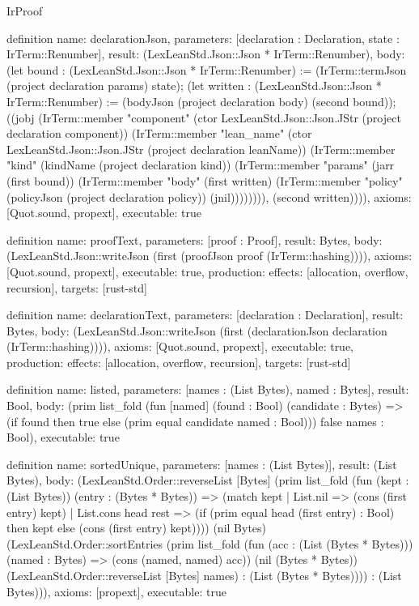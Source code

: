 \begin{lexlean}{IrProof}
\begin{semanticmodule}
definition{
  name: declarationJson,
  parameters: [declaration : Declaration, state : IrTerm::Renumber],
  result: (LexLeanStd.Json::Json * IrTerm::Renumber),
  body: (let bound : (LexLeanStd.Json::Json * IrTerm::Renumber) := (IrTerm::termJson (project declaration params) state); (let written : (LexLeanStd.Json::Json * IrTerm::Renumber) := (bodyJson (project declaration body) (second bound)); ((jobj (IrTerm::member "component" (ctor LexLeanStd.Json::Json.JStr (project declaration component)) (IrTerm::member "lean_name" (ctor LexLeanStd.Json::Json.JStr (project declaration leanName)) (IrTerm::member "kind" (kindName (project declaration kind)) (IrTerm::member "params" (jarr (first bound)) (IrTerm::member "body" (first written) (IrTerm::member "policy" (policyJson (project declaration policy)) (jnil)))))))), (second written)))),
  axioms: [Quot.sound, propext],
  executable: true
}

definition{
  name: proofText,
  parameters: [proof : Proof],
  result: Bytes,
  body: (LexLeanStd.Json::writeJson (first (proofJson proof (IrTerm::hashing)))),
  axioms: [Quot.sound, propext],
  executable: true,
  production: {effects: [allocation, overflow, recursion], targets: [rust-std]}
}

definition{
  name: declarationText,
  parameters: [declaration : Declaration],
  result: Bytes,
  body: (LexLeanStd.Json::writeJson (first (declarationJson declaration (IrTerm::hashing)))),
  axioms: [Quot.sound, propext],
  executable: true,
  production: {effects: [allocation, overflow, recursion], targets: [rust-std]}
}

definition{
  name: listed,
  parameters: [names : (List Bytes), named : Bytes],
  result: Bool,
  body: (prim list_fold (fun [named] (found : Bool) (candidate : Bytes) => (if found then true else (prim equal candidate named : Bool))) false names : Bool),
  executable: true
}

definition{
  name: sortedUnique,
  parameters: [names : (List Bytes)],
  result: (List Bytes),
  body: (LexLeanStd.Order::reverseList [Bytes] (prim list_fold (fun (kept : (List Bytes)) (entry : (Bytes * Bytes)) => (match kept
    | List.nil => (cons (first entry) kept)
    | List.cons head rest => (if (prim equal head (first entry) : Bool) then kept else (cons (first entry) kept)))) (nil Bytes) (LexLeanStd.Order::sortEntries (prim list_fold (fun (acc : (List (Bytes * Bytes))) (named : Bytes) => (cons (named, named) acc)) (nil (Bytes * Bytes)) (LexLeanStd.Order::reverseList [Bytes] names) : (List (Bytes * Bytes)))) : (List Bytes))),
  axioms: [propext],
  executable: true
}


\end{semanticmodule}
\end{lexlean}
